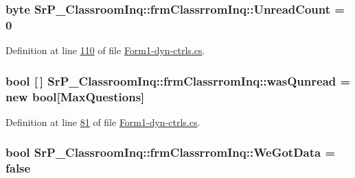 \hypertarget{class_sr_p___classroom_inq_1_1frm_classrrom_inq_a9978aff45fb1057f102e224f8485f096}{
\subsubsection[{\-Unread\-Count}]{\setlength{\rightskip}{0pt plus 5cm}byte {\bf \-Sr\-P\-\_\-\-Classroom\-Inq\-::frm\-Classrrom\-Inq\-::\-Unread\-Count} = 0}}
\label{class_sr_p___classroom_inq_1_1frm_classrrom_inq_a9978aff45fb1057f102e224f8485f096}


\-Definition at line \hyperlink{_form1-dyn-ctrls_8cs_source_l00110}{110} of file \hyperlink{_form1-dyn-ctrls_8cs_source}{\-Form1-\/dyn-\/ctrls.\-cs}.

\hypertarget{class_sr_p___classroom_inq_1_1frm_classrrom_inq_adc405f927295c61b4675a8b28142c645}{
\subsubsection[{was\-Qunread}]{\setlength{\rightskip}{0pt plus 5cm}bool \mbox{[}$\,$\mbox{]} {\bf \-Sr\-P\-\_\-\-Classroom\-Inq\-::frm\-Classrrom\-Inq\-::was\-Qunread} = new bool\mbox{[}{\bf \-Max\-Questions}\mbox{]}}}
\label{class_sr_p___classroom_inq_1_1frm_classrrom_inq_adc405f927295c61b4675a8b28142c645}


\-Definition at line \hyperlink{_form1-dyn-ctrls_8cs_source_l00081}{81} of file \hyperlink{_form1-dyn-ctrls_8cs_source}{\-Form1-\/dyn-\/ctrls.\-cs}.

\hypertarget{class_sr_p___classroom_inq_1_1frm_classrrom_inq_a44eb31e84ef4705e39c15c4d6047807e}{
\subsubsection[{\-We\-Got\-Data}]{\setlength{\rightskip}{0pt plus 5cm}bool {\bf \-Sr\-P\-\_\-\-Classroom\-Inq\-::frm\-Classrrom\-Inq\-::\-We\-Got\-Data} = false}}
\label{class_sr_p___classroom_inq_1_1frm_classrrom_inq_a44eb31e84ef4705e39c15c4d6047807e}


